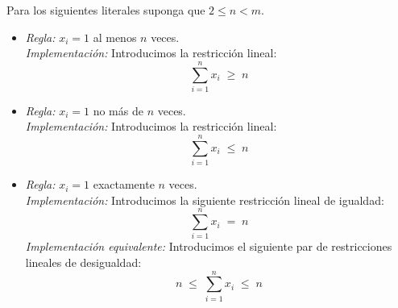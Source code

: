 \documentclass[ 10pt, xcolor = dvipsnames]{beamer}
\begin{document}
\begin{frame}[allowframebreaks]
\frametitle{\insertsection}

Para los siguientes literales suponga que $2 \leq n < m$. 
\begin{itemize}
\item \emph{Regla:} $x_i = 1$ al menos $n$ veces. \\[1ex] \emph{Implementaci\'on:} Introducimos la restricci\'on lineal: 
\[
\sum_{i=1}^n x_i \; \geq \; n
\]
\item \emph{Regla:} $x_i = 1$ no m\'as de $n$ veces. \\[1ex] \emph{Implementaci\'on:} Introducimos la restricci\'on lineal: 
\[
\sum_{i=1}^n x_i \; \leq \; n
\]
\item \emph{Regla:} $x_i = 1$ exactamente $n$ veces. \\[1ex] \emph{Implementaci\'on:} Introducimos la siguiente restricci\'on lineal de igualdad: 
\[
\sum_{i=1}^n x_i \; = \; n
\]
\emph{Implementaci\'on equivalente:} Introducimos el siguiente par de restricciones lineales de desigualdad: 
\[
n \; \leq \; \sum_{i=1}^n x_i \; \leq \; n
\]
\end{itemize}

\end{frame}
\end{document}
